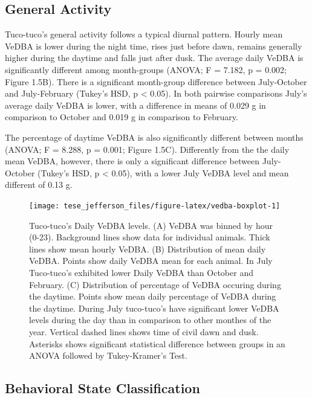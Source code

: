 \documentclass[msc,numbers,hidelinks]{coppe}
\begin{document}
  \hypertarget{general-activity-1}{%
  \subsection{General Activity}\label{general-activity-1}}

  Tuco-tuco's general activity follows a typical diurnal pattern. Hourly mean VeDBA is lower during the night time, rises just before dawn, remains generally higher during the daytime and falls just after dusk. The average daily VeDBA is significantly different among month-groups (ANOVA; F = 7.182, p = 0.002; Figure 1.5B). There is a significant month-group difference between July-October and July-February (Tukey's HSD, p \textless{} 0.05). In both pairwise comparisons July's average daily VeDBA is lower, with a difference in means of 0.029 g in comparison to October and 0.019 g in comparison to February.

  The percentage of daytime VeDBA is also significantly different between months (ANOVA; F = 8.288, p = 0.001; Figure 1.5C). Differently from the the daily mean VeDBA, however, there is only a significant difference between July-October (Tukey's HSD, p \textless{} 0.05), with a lower July VeDBA level and mean different of 0.13 g.\newline
  \begin{figure}[H]

  {\centering \texttt{[image: tese\_jefferson\_files/figure-latex/vedba-boxplot-1]} 

  }

  \caption{Tuco-tuco's Daily VeDBA levels. (A) VeDBA was binned by hour (0-23). Background lines show data for individual animals. Thick lines show mean hourly VeDBA. (B) Distribution of mean daily VeDBA. Points show daily VeDBA mean for each animal. In July Tuco-tuco's exhibited lower Daily VeDBA than October and February. (C) Distribution of percentage of VeDBA occuring during the daytime. Points show mean daily percentage of VeDBA during the daytime. During July tuco-tuco's have significant lower VeDBA levels during the day than in comparison to other monthes of the year. Vertical dashed lines shows time of civil dawn and dusk. Asterisks shows significant statistical difference between groups in an ANOVA followed by Tukey-Kramer's Test.}\label{fig:vedba-boxplot}
  \end{figure}
  \hypertarget{behavioral-state-classification-1}{%
  \subsection{Behavioral State Classification}\label{behavioral-state-classification-1}}
\end{document}
